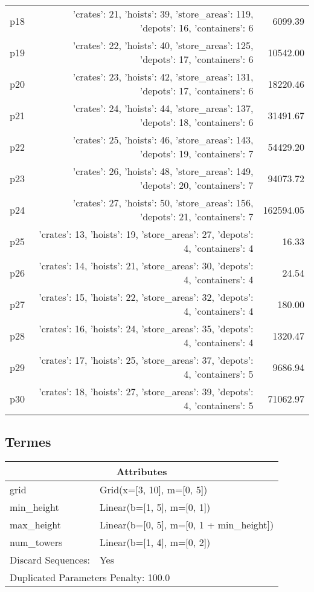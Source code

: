\documentclass{article}
\begin{document}
\begin{center}
\begin{tabular}{@{}l|r|r@{}}
  p18&{'crates': 21, 'hoists': 39, 'store\_areas': 119, 'depots': 16, 'containers': 6}&6099.39\\
  p19&{'crates': 22, 'hoists': 40, 'store\_areas': 125, 'depots': 17, 'containers': 6}&10542.00\\
  p20&{'crates': 23, 'hoists': 42, 'store\_areas': 131, 'depots': 17, 'containers': 6}&18220.46\\
  p21&{'crates': 24, 'hoists': 44, 'store\_areas': 137, 'depots': 18, 'containers': 6}&31491.67\\
  p22&{'crates': 25, 'hoists': 46, 'store\_areas': 143, 'depots': 19, 'containers': 7}&54429.20\\
  p23&{'crates': 26, 'hoists': 48, 'store\_areas': 149, 'depots': 20, 'containers': 7}&94073.72\\
  p24&{'crates': 27, 'hoists': 50, 'store\_areas': 156, 'depots': 21, 'containers': 7}&162594.05\\
  p25&{'crates': 13, 'hoists': 19, 'store\_areas': 27, 'depots': 4, 'containers': 4}&16.33\\
  p26&{'crates': 14, 'hoists': 21, 'store\_areas': 30, 'depots': 4, 'containers': 4}&24.54\\
  p27&{'crates': 15, 'hoists': 22, 'store\_areas': 32, 'depots': 4, 'containers': 4}&180.00\\
  p28&{'crates': 16, 'hoists': 24, 'store\_areas': 35, 'depots': 4, 'containers': 4}&1320.47\\
  p29&{'crates': 17, 'hoists': 25, 'store\_areas': 37, 'depots': 4, 'containers': 5}&9686.94\\
  p30&{'crates': 18, 'hoists': 27, 'store\_areas': 39, 'depots': 4, 'containers': 5}&71062.97
                            \end{tabular}
                            \end{center}
                    
                            \newpage \subsection{Termes}
                    \begin{center}
                    \begin{tabular}{@{}p{}p{}@{}}
                    \multicolumn{2}{c}{\bf \large Attributes}\\\midrule
                    grid & Grid(x=[3, 10], m=[0, 5])\\
min\_height & Linear(b=[1, 5], m=[0, 1])\\
max\_height & Linear(b=[0, 5], m=[0, 1 + min\_height])\\
num\_towers & Linear(b=[1, 4], m=[0, 2])
                                \\\midrule
                                Discard Sequences: & Yes \\\midrule
                    \multicolumn{2}{l}{Duplicated Parameters Penalty: 100.0}
                    \end{tabular}
                    \end{center}
                
\end{document}
